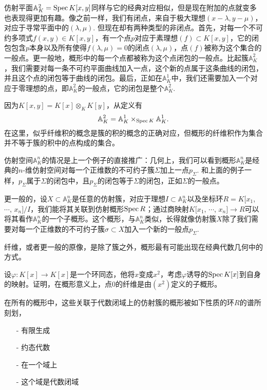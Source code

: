 
仿射平面$\mathbb{A}^2_K=\operatorname{Spec} K[x,y]$同样与它的经典对应相似，但是现在附加的点就变多也表现得更加有趣。像之前一样，我们有闭点，来自于极大理想$(x-\lambda,y-\mu)$，对应于寻常平面中的$(\lambda,\mu)$. 但现在却有两种类型的非闭点。首先，对每一个不可约多项式$f(x,y)\in K[x,y]$，有一个点$p$对应于素理想$(f)\subset K[x,y]$，它的闭包包含$p$本身以及所有使得$f(\lambda,\mu)=0$的闭点$(\lambda,\mu)$，点$(f)$被称为这个集合的一般点。更一般地，概形中的每一个点都被称为这个点闭包的一般点。比起簇$\mathbb{A}^2_K$，我们需要对每一条不可约平面曲线加入一点，这个新的点属于这条曲线的闭包，并且这个点的闭包等于曲线的闭包。最后，正如在$\mathbb{A}^1_K$中，我们还需要加入一个对应于零理想的点，即$\mathbb{A}^2_K$的一般点，它的闭包是整个$\mathbb{A}^2_K$.


因为$K[x,y]=K[x]\otimes_K K[y]$，从定义有
\[
	\mathbb{A}^2_K=\mathbb{A}^1_K\times_{\operatorname{Spec} K}\mathbb{A}^1_K.
\]
在这里，似乎纤维积的概念是簇的积的概念的正确对应，但概形的纤维积作为集合并不等于簇的积中的点构成的集合。

仿射空间$\mathbb{A}^n_K$的情况是上一个例子的直接推广：几何上，我们可以看到概形$\mathbb{A}^n_K$是经典的$n$-维仿射空间对每一个正维数的不可约子簇$\Sigma$加上一点$p_\Sigma$. 和上面的例子一样，$p_\Sigma$属于$\Sigma$的闭包中，且$p_\Sigma$的闭包等于$\Sigma$的闭包，正如$\Sigma$的一般点。

更一般的，设$X\subset \mathbb{A}^n_K$是任意的仿射簇，对应于理想$I\subset \mathbb{A}^n_K$以及坐标环$R=K[x_1$, $\cdots$, $x_n]/I$，我们能将其关联到仿射概形$\operatorname{Spec} R$；通过商映射$K[x_1$, $\cdots$, $x_n]\to R$可以将其看作$\mathbb{A}^n_K$的一个子概形。这个概形，与$\mathbb{A}^n_K$类似，长得就像仿射簇$X$除了我们需要对每一个正维数的不可约子簇$\sigma\subset X$加入一个新的一般点$p_\Sigma$.

纤维，或者更一般的原像，是除了簇之外，概形最有可能出现在经典代数几何中的方式。

\begin{exe}
设$\varphi:K[x]\to K[x]$是一个环同态，他将$x$变成$x^2$，考虑$\varphi$诱导的$\operatorname{Spec} K[x]$到自身的映射。证明，在概形意义上，点$0$的纤维是由$(x^2)$定义的子概形。

\end{exe}

在所有的概形中，这些关联于代数闭域上的仿射簇的概形被如下性质的环$R$的谱所刻划，

\begin{itemize}\setlength{\itemsep}{0pt}
\item[-] 有限生成
\item[-] 约态代数
\item[-] 在一个域上
\item[-] 这个域是代数闭域
\end{itemize}

